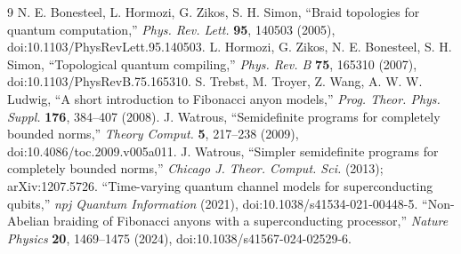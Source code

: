 \documentclass[11pt,a4paper]{article}
\theoremstyle{remark}
\begin{document}
\begin{thebibliography}{9}
 N. E. Bonesteel, L. Hormozi, G. Zikos, S. H. Simon, ``Braid topologies for quantum computation,'' \emph{Phys. Rev. Lett.} \textbf{95}, 140503 (2005), doi:10.1103/PhysRevLett.95.140503.
 L. Hormozi, G. Zikos, N. E. Bonesteel, S. H. Simon, ``Topological quantum compiling,'' \emph{Phys. Rev. B} \textbf{75}, 165310 (2007), doi:10.1103/PhysRevB.75.165310.
 S. Trebst, M. Troyer, Z. Wang, A. W. W. Ludwig, ``A short introduction to Fibonacci anyon models,'' \emph{Prog. Theor. Phys. Suppl.} \textbf{176}, 384--407 (2008).
 J. Watrous, ``Semidefinite programs for completely bounded norms,'' \emph{Theory Comput.} \textbf{5}, 217--238 (2009), doi:10.4086/toc.2009.v005a011.
 J. Watrous, ``Simpler semidefinite programs for completely bounded norms,'' \emph{Chicago J. Theor. Comput. Sci.} (2013); arXiv:1207.5726.
 ``Time-varying quantum channel models for superconducting qubits,'' \emph{npj Quantum Information} (2021), doi:10.1038/s41534-021-00448-5.
 ``Non-Abelian braiding of Fibonacci anyons with a superconducting processor,'' \emph{Nature Physics} \textbf{20}, 1469--1475 (2024), doi:10.1038/s41567-024-02529-6.
\end{thebibliography}
\end{document}
